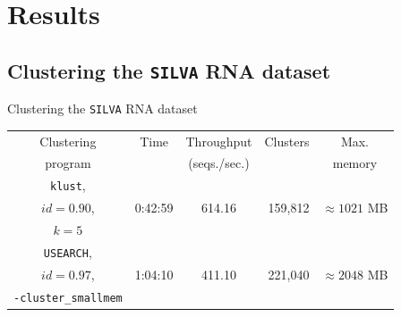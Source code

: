 \documentclass{beamer}
\begin{document}
\section{Results}



\subsection{Clustering the \texttt{SILVA} RNA dataset}

\begin{frame}{Clustering the \texttt{SILVA} RNA dataset}
  \begin{adjustbox}{center}
  \footnotesize
  \begin{tabular}{c|c|c|r|c}
  Clustering        & Time    & Throughput   & Clusters & Max.              \\
  program           &         & (seqs./sec.) &          & memory            \\
  \hline \hline
  \texttt{klust},   &         &              &          &                   \\
  $id = 0.90$,      & 0:42:59 & 614.16       & 159,812  & $\approx 1021$ MB \\
  $k = 5$           &         &              &          &                   \\
  \hline
  \texttt{USEARCH}, &         &              &          &                   \\
  $id=0.97$,        & 1:04:10 & 411.10       & 221,040  & $\approx 2048$ MB \\
  \texttt{-cluster\_smallmem} & & & & \\
  \end{tabular}
  \end{adjustbox}
\end{frame}
\end{document}
